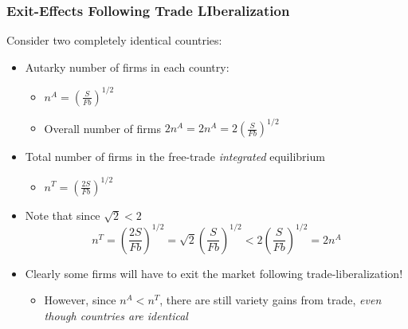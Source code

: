 \documentclass{beamer}
\begin{document}
\begin{frame}
	\frametitle{Exit-Effects Following Trade LIberalization}	
	
	Consider two completely identical countries:
	\begin{itemize}
		\item Autarky number of firms in each country:
		\begin{itemize}
			\item $n^A=\left(\frac{S}{Fb}\right)^{1/2}$
			\item Overall number of firms $2n^A=2n^A=2\left(\frac{S}{Fb}\right)^{1/2}$
		\end{itemize}
		\item Total number of firms in the free-trade \emph{integrated} equilibrium
		\begin{itemize}
			\item $n^T=\left(\frac{2S}{Fb}\right)^{1/2}$
		\end{itemize}
		\item Note that since $\sqrt{2}<2$
		\scriptsize
		\begin{equation}
		n^T = \left(\frac{2S}{Fb}\right)^{1/2} = \sqrt{2}\left(\frac{S}{Fb}\right)^{1/2} < 2\left(\frac{S}{Fb}\right)^{1/2}  = 2n^A \nonumber
		\end{equation}
		\normalsize
		\item Clearly some firms will have to exit the market following trade-liberalization!
		\begin{itemize}
			\item However, since $n^A<n^T$, there are still variety gains from trade, \emph{even though countries are identical}
		\end{itemize}
	\end{itemize}
	
\end{frame}
\end{document}
